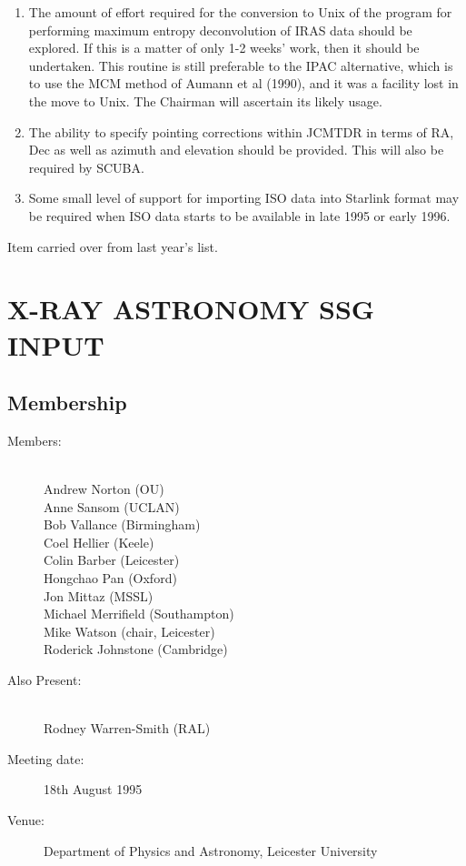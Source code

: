 \begin{enumerate}
\item The amount of effort required for the conversion to Unix of the
program for performing maximum entropy deconvolution of IRAS data
should be explored. If this is a matter of only 1-2 weeks' work, then
it should be undertaken. This routine is still preferable to the IPAC
alternative, which is to use the MCM method of Aumann et al (1990),
and it was a facility lost in the move to Unix. The Chairman will
ascertain its likely usage.

\item The ability to specify pointing corrections within JCMTDR in
terms of RA, Dec as well as azimuth and elevation should be
provided. This will also be required by SCUBA.

\item Some small level of support for importing ISO data into Starlink
format may be required when ISO data starts to be available in late
1995 or early 1996.

\end{enumerate}
{\small *Item carried over from last year's list.}

\newpage
\section{X-RAY ASTRONOMY SSG INPUT}

\subsection{Membership}

\begin{description}
\item[Members:]\mbox{}\\
Andrew Norton (OU)\\
Anne Sansom (UCLAN)\\
Bob Vallance (Birmingham)\\
Coel Hellier (Keele)\\
Colin Barber (Leicester)\\
Hongchao Pan (Oxford)\\
Jon Mittaz (MSSL)\\
Michael Merrifield (Southampton)\\
Mike Watson (chair, Leicester)\\
Roderick Johnstone (Cambridge)

\item[Also Present:]\mbox{}\\
Rodney Warren-Smith (RAL)

\item[Meeting date:]18th August 1995

\item[Venue:]Department of Physics and Astronomy, Leicester University
\end{description}


